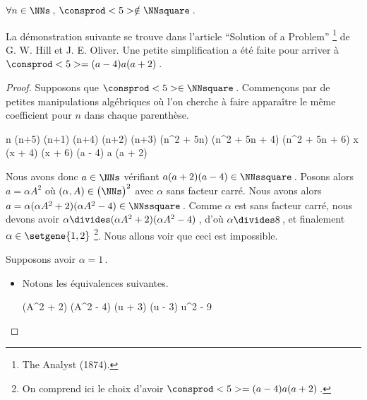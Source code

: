 \begin{fact} \label{case-6}
	 $\forall n \in \NNs$\,, $\consprod<5> \notin \NNsquare$\,.
\end{fact}




La démonstration suivante se trouve dans l'article \enquote{Solution of a Problem}
\footnote{
	The Analyst (1874).
}
de G. W. Hill et J. E. Oliver.
Une petite simplification a été faite pour arriver à $\consprod<5> = (a - 4) a (a + 2)$\,.


\begin{proof}
    Supposons que $\consprod<5> \in \NNsquare$\,.
    Commençons par de petites manipulations algébriques où l'on cherche à faire apparaître le même coefficient pour $n$ dans chaque parenthèse.
    
    \medskip
    \begin{stepcalc}[style = sar]
	\explnext{}
		n (n+5) \cdot (n+1) (n+4) \cdot (n+2) (n+3)
	\explnext{}
		(n^2 + 5n) (n^2 + 5n + 4) (n^2 + 5n + 6)
		x (x + 4) (x + 6)
		(a - 4) a (a + 2)
    \end{stepcalc}
  
    \medskip
    Nous avons donc $a \in \NNs$ vérifiant $a (a + 2) (a - 4) \in \NNssquare$\,. 
    Posons alors $a = \alpha A^2$ où $(\alpha, A) \in \big( \NNs \big)^2$ avec $\alpha$ sans facteur carré.
    Nous avons alors $a = \alpha (\alpha A^2 + 2) (\alpha A^2 - 4) \in \NNssquare$\,.
    Comme $\alpha$ est sans facteur carré, nous devons avoir $\alpha \divides (\alpha A^2 + 2) (\alpha A^2 - 4)$\,, d'où $\alpha \divides 8$\,, et finalement $\alpha \in \setgene{1, 2}$
    \footnote{
    	On comprend ici le choix d'avoir $\consprod<5> = (a - 4) a (a + 2)$\,.
    }.
    Nous allons voir que ceci est impossible.
    
    \medskip
    
    Supposons avoir $\alpha = 1$\,.
    
    \begin{itemize}
    	\item Notons les équivalences suivantes.
        
        \medskip
        \noindent\kern-6pt%
        \begin{stepcalc}[style=ar*, ope=\iff]
        	(A^2 + 2) (A^2 - 4) \in \NNssquare
        	(u + 3) (u - 3) \in \NNssquare
    	\explnext{}
        	u^2 - 9 \in \NNssquare
        \end{stepcalc}


\end{itemize}
\end{proof}
